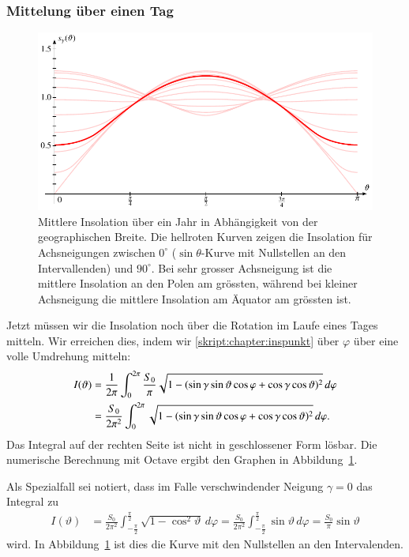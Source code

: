 \subsubsection{Mittelung über einen Tag}
\begin{figure}
\centering
\includegraphics{chapters/5/ell2.pdf}
\caption{Mittlere Insolation über ein Jahr in Abhängigkeit von der
geographischen Breite.
Die hellroten Kurven zeigen die Insolation für Achsneigungen zwischen
$0^\circ$ ($\sin\theta$-Kurve mit Nullstellen an den Intervallenden)
und $90^\circ$.
Bei sehr grosser Achsneigung ist die mittlere Insolation an den Polen
am grössten, während bei kleiner Achsneigung die mittlere Insolation
am Äquator am grössten ist.
\label{skript:einstrahlung:jahrinsbild}}
\end{figure}
Jetzt müssen wir die Insolation noch über die Rotation im Laufe eines 
Tages mitteln.
Wir erreichen dies, indem wir \eqref{skript:chapter:inspunkt}
über $\varphi$ über eine volle Umdrehung mitteln:
\begin{align}
I(\vartheta)
&=
\frac{1}{2\pi}
\int_0^{2\pi}
\frac{S_0}{\pi}
\sqrt{1-
(\sin\gamma\sin\vartheta\cos\varphi+\cos\gamma\cos\vartheta)^2}
\,d\varphi
\notag
\\
&=
\frac{S_0}{2\pi^2}
\int_0^{2\pi}
\sqrt{1-
(\sin\gamma\sin\vartheta\cos\varphi+\cos\gamma\cos\vartheta)^2}
\,d\varphi.
\label{skript:einstrahlung:mittlereinsolation}
\end{align}
Das Integral auf der rechten Seite ist nicht in geschlossener
Form lösbar.
Die numerische Berechnung mit Octave ergibt den Graphen
in Abbildung~\ref{skript:einstrahlung:jahrinsbild}.

Als Spezialfall sei notiert, dass im Falle verschwindender Neigung
$\gamma=0$ das Integral zu
\begin{align*}
I(\vartheta)
&=
\frac{S_0}{2\pi^2}
\int_{-\frac{\pi}2}^{\frac{\pi}2}
\sqrt{1-\cos^2\vartheta}
\,d\varphi
=
\frac{S_0}{2\pi^2}
\int_{-\frac{\pi}2}^{\frac{\pi}2}
\sin\vartheta
\,d\varphi
=
\frac{S_0}{\pi}
\sin\vartheta
\end{align*}
wird.
In Abbildung~\ref{skript:einstrahlung:jahrinsbild} ist dies die
Kurve mit den Nullstellen an den Intervalenden.

